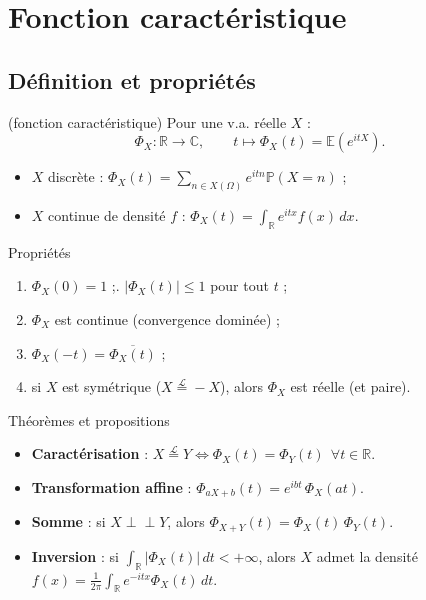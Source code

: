 \documentclass[11pt,a4paper]{article}
\newcommand{\E}{\mathbb{E}}
\renewcommand{\P}{\mathbb{P}}
\newcommand{\R}{\mathbb{R}}
\newcommand{\C}{\mathbb{C}}
\newcommand{\loi}{\overset{\mathcal L}{=}}
\begin{document}
\section{Fonction caractéristique}
\subsection{Définition et propriétés}
\begin{defn}{(fonction caractéristique)}
Pour une v.a. réelle $X$ :
\[ \Phi_X:\R\to\C,\qquad t\mapsto\Phi_X(t)=\E(e^{itX}). \]
\begin{itemize}
\item $X$ discrète : $\Phi_X(t)=\sum_{n\in X(\Omega)}e^{itn}\P(X=n)$ ;
\item $X$ continue de densité $f$ : $\Phi_X(t)=\int_{\R}e^{itx}f(x)\,dx$.
\end{itemize}
\end{defn}

\begin{thm}{Propriétés}
\begin{enumerate}[label=\arabic*.,nosep]
\item $\Phi_X(0)=1$ ;. $|\Phi_X(t)|\le1$ pour tout $t$ ;
\item $\Phi_X$ est continue (convergence dominée) ;
\item $\Phi_X(-t)=\overline{\Phi_X(t)}$ ;
\item si $X$ est symétrique ($X\loi -X$), alors $\Phi_X$ est réelle (et paire).
\end{enumerate}
\end{thm}

\begin{thm}{Théorèmes et propositions}
\begin{itemize}
\item \textbf{Caractérisation} : $X\loi Y\iff\Phi_X(t)=\Phi_Y(t)\ \ \forall t\in\R$.
\item \textbf{Transformation affine} : $\Phi_{aX+b}(t)=e^{ibt}\,\Phi_X(at)$.
\item \textbf{Somme} : si $X\perp\!\!\!\perp Y$, alors $\Phi_{X+Y}(t)=\Phi_X(t)\,\Phi_Y(t)$.
\item \textbf{Inversion} : si $\int_\R|\Phi_X(t)|\,dt<+\infty$, alors $X$ admet la densité
$\displaystyle f(x)=\frac1{2\pi}\int_{\R}e^{-itx}\Phi_X(t)\,dt.$
\end{itemize}
\end{thm}
\end{document}
